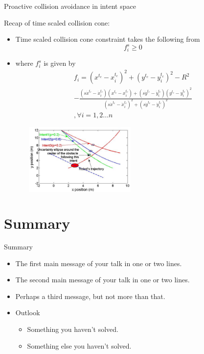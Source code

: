\documentclass{beamer}
\begin{document}
\begin{frame}{Proactive collision avoidance in intent space}
\begin{block}{Recap of time scaled collision cone:}
\begin{itemize}
\item{Time scaled collision cone constraint takes the following from}
$$f_i^s \geq 0 $$
\item{where $f_i^s$ is given by}
\begin{eqnarray}\label{collcone}
 f_i= (x^{t_c}-x_i^{t_c})^2+(y^{t_c}-y_i^{t_c})^2- R^2\\ \nonumber- \frac{(s\dot{x}^{t_c}-\dot{x}_i^{t_c})(x^{t_c}-x_i^{t_c})+(s\dot{y}^{t_c}-\dot{y}_i^{t_c})(y^{t_c}-y_i^{t_c})^2}{(s\dot{x}^{t_c}-\dot{x}_i^{t_c})^2+(s\dot{y}^{t_c}-\dot{y}_i^{t_c})^2} \\\nonumber, \forall i = {1,2...n}
\end{eqnarray}
\end{itemize}
\begin{figure}
\centering
\includegraphics[width= 6.1cm, height=3.5cm]{fig2.eps}
\end{figure}
\end{block}
\end{frame}
\section*{Summary}

\begin{frame}{Summary}
  \begin{itemize}
  \item
    The \alert{first main message} of your talk in one or two lines.
  \item
    The \alert{second main message} of your talk in one or two lines.
  \item
    Perhaps a \alert{third message}, but not more than that.
  \end{itemize}
  
  \begin{itemize}
  \item
    Outlook
    \begin{itemize}
    \item
      Something you haven't solved.
    \item
      Something else you haven't solved.
    \end{itemize}
  \end{itemize}
\end{frame}
\end{document}
